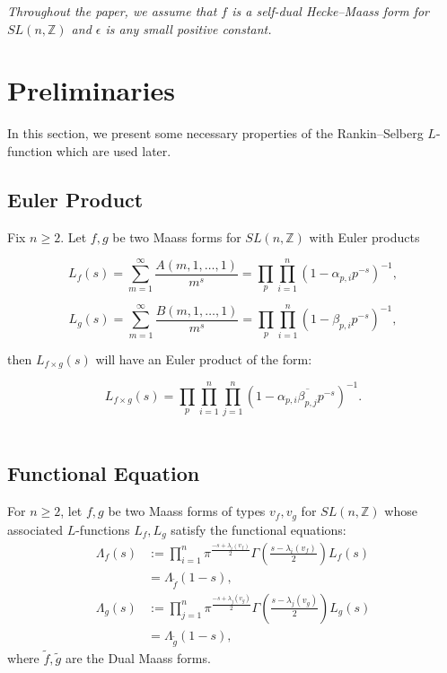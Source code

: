 \documentclass[sn-mathphys,Numbered]{sn-jnl}
\theoremstyle{thmstyleone}%
\theoremstyle{thmstyletwo}%
\theoremstyle{thmstylethree}%
\begin{document}
\emph{Throughout the paper, we assume that $f$ is a self-dual Hecke--Maass form for $SL(n,\mathbb{Z})$ and $\epsilon$ is any small positive constant.}






\section{Preliminaries} 

\noindent
In this section, we present some necessary properties of the Rankin--Selberg $L$-function which are used later.

\subsection{Euler Product} 

\noindent 
Fix $n \geq 2$. Let $f,g$ be two Maass forms for $SL(n,\mathbb{Z})$ with Euler products

$$ L_f(s) = \sum_{m=1}^{\infty} \frac{A(m,1,\dots,1)}{m^s} = \prod_p \prod_{i=1}^n (1-\alpha_{p,i}p^{-s})^{-1} ,$$

$$ L_g(s) = \sum_{m=1}^{\infty} \frac{B(m,1,\dots,1)}{m^s} = \prod_p \prod_{i=1}^n (1-\beta_{p,i}p^{-s})^{-1} ,$$

\noindent
then $L_{f \times g}(s)$ will have an Euler product of the form:

$$ L_{f \times g}(s) = \prod_p \prod_{i=1}^n \prod_{j=1}^n (1-\alpha_{p,i} \overline{\beta_{p,j}} p^{-s})^{-1} .$$ \\



\subsection{Functional Equation} 

\noindent
For $n \geq 2$, let $f,g$ be two Maass forms of types $v_f,v_g$ for $SL(n,\mathbb{Z})$  whose associated $L$-functions $L_f,L_g$ satisfy the functional equations:
\begin{align*}
\Lambda_f(s) &:= \prod_{i=1}^n \pi^{\frac{-s+\lambda_i(v_f)}{2}} \Gamma \left( \frac{s-\lambda_i(v_f)}{2} \right) L_f(s) \\
&= \Lambda_{\tilde{f}}(1-s), \\
\Lambda_g(s) &:= \prod_{j=1}^n \pi^{\frac{-s+\lambda_j(v_g)}{2}} \Gamma \left( \frac{s-\lambda_j(v_g)}{2} \right) L_g(s) \\
&= \Lambda_{\tilde{g}}(1-s),
\end{align*}
where $\tilde{f},\tilde{g}$ are the Dual Maass forms. \\
\end{document}
